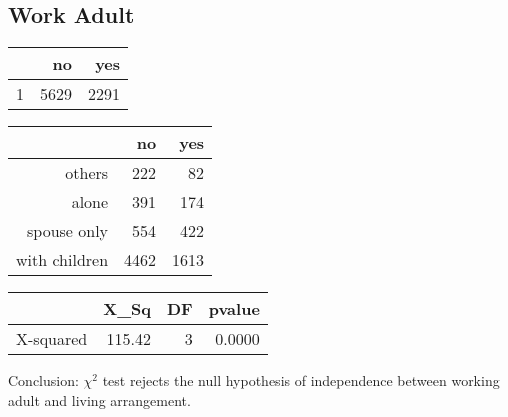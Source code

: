 \documentclass[11pt]{article}
\begin{document}
\subsection*{Work Adult}
\begin{table}[ht]
\centering
\begin{tabular}{rrr}
  \hline
 & no & yes \\ 
  \hline
1 & 5629 & 2291 \\ 
   \hline
\end{tabular}
\end{table}%
\begin{table}[ht]
\centering
\begin{tabular}{rrr}
  \hline
 & no & yes \\ 
  \hline
others & 222 &  82 \\ 
  alone & 391 & 174 \\ 
  spouse only & 554 & 422 \\ 
  with children & 4462 & 1613 \\ 
   \hline
\end{tabular}
\end{table}%
\begin{table}[ht]
\centering
\begin{tabular}{rrrr}
  \hline
 & X\_Sq & DF & pvalue \\ 
  \hline
X-squared & 115.42 & 3 & 0.0000 \\ 
   \hline
\end{tabular}
\end{table}Conclusion: $\chi^2$ test rejects the null hypothesis of independence between working adult and living arrangement. 

\newpage
\end{document}
